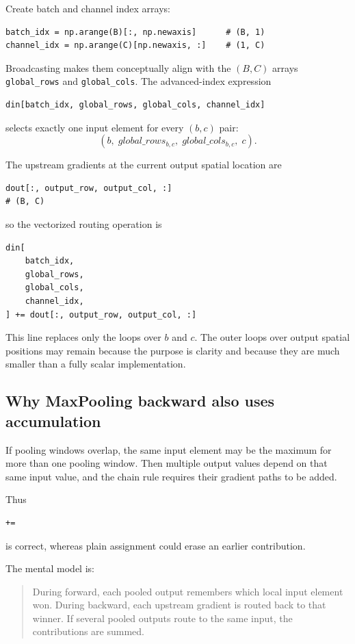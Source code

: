 \documentclass[11pt,a4paper]{article}
\newcommand{\code}[1]{\texttt{#1}}
\begin{document}
Create batch and channel index arrays:
\begin{lstlisting}
batch_idx = np.arange(B)[:, np.newaxis]      # (B, 1)
channel_idx = np.arange(C)[np.newaxis, :]    # (1, C)
\end{lstlisting}

Broadcasting makes them conceptually align with the $(B,C)$ arrays \code{global\_rows} and \code{global\_cols}. The advanced-index expression
\begin{lstlisting}
din[batch_idx, global_rows, global_cols, channel_idx]
\end{lstlisting}
selects exactly one input element for every $(b,c)$ pair:
\[
(b,\;global\_rows_{b,c},\;global\_cols_{b,c},\;c).
\]

The upstream gradients at the current output spatial location are
\begin{lstlisting}
dout[:, output_row, output_col, :]
# (B, C)
\end{lstlisting}
so the vectorized routing operation is
\begin{lstlisting}
din[
    batch_idx,
    global_rows,
    global_cols,
    channel_idx,
] += dout[:, output_row, output_col, :]
\end{lstlisting}

This line replaces only the loops over $b$ and $c$. The outer loops over output spatial positions may remain because the purpose is clarity and because they are much smaller than a fully scalar implementation.

\subsection{Why MaxPooling backward also uses accumulation}

If pooling windows overlap, the same input element may be the maximum for more than one pooling window. Then multiple output values depend on that same input value, and the chain rule requires their gradient paths to be added.

Thus
\begin{lstlisting}
+=
\end{lstlisting}
is correct, whereas plain assignment could erase an earlier contribution.

The mental model is:
\begin{quote}
During forward, each pooled output remembers which local input element won. During backward, each upstream gradient is routed back to that winner. If several pooled outputs route to the same input, the contributions are summed.
\end{quote}
\end{document}
